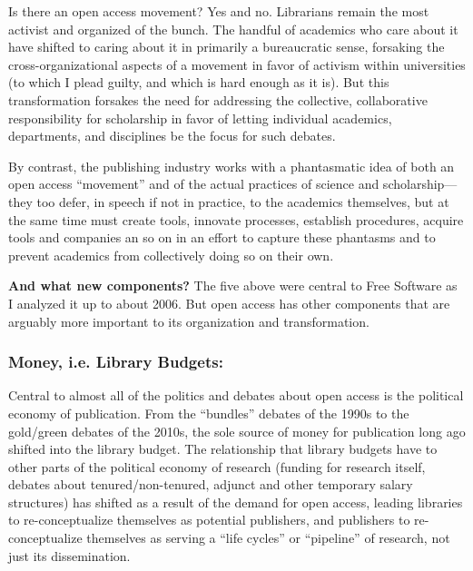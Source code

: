 \documentclass[11pt]{article}
\begin{document}
Is there an open access movement?  Yes and no.  Librarians remain the most activist and organized of the bunch.  The handful of academics who care about it have shifted to caring about it in primarily a bureaucratic sense, forsaking the cross-organizational aspects of a movement in favor of activism within universities (to which I plead guilty, and which is hard enough as it is).  But this transformation forsakes the need for addressing the collective, collaborative responsibility for scholarship in favor of letting individual academics, departments, and disciplines be the focus for such debates. 

By contrast, the publishing industry works with a phantasmatic idea of both an open access ``movement'' and of the actual practices of science and scholarship--- they too defer, in speech if not in practice, to the academics themselves, but at the same time must create tools, innovate processes, establish procedures, acquire tools and companies an so on in an effort to capture these phantasms and to prevent academics from collectively doing so on their own. 


\textbf{And what new components?}  The five above were central to Free Software as I analyzed it up to about 2006.  But open access has other components that are arguably more important to its organization and transformation.

\subsubsection*{\textbf{Money, i.e. Library Budgets}:}
\label{sec:orgb2afcbe}
Central to almost all of the politics and debates about open access is the political economy of publication.  From the ``bundles'' debates of the 1990s to the gold/green debates of the 2010s, the sole source of money for publication long ago shifted into the library budget. The relationship that library budgets have to other parts of the political economy of research (funding for research itself, debates about tenured/non-tenured, adjunct and other temporary salary structures) has shifted as a result of the demand for open access, leading libraries to re-conceptualize themselves as potential publishers, and publishers to re-conceptualize themselves as serving a ``life cycles'' or ``pipeline'' of research, not just its dissemination.
\end{document}
